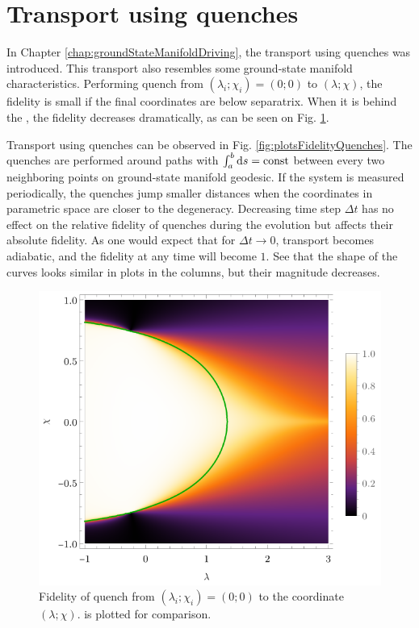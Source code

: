 \section{Transport using quenches}
In Chapter \ref{chap:groundStateManifoldDriving}, the transport using quenches was introduced. This transport also resembles some ground-state manifold characteristics. Performing quench from $(\lambda_i;\chi_i)=(0;0)$ to $(\lambda;\chi)$, the fidelity is small if the final coordinates are below separatrix. When it is behind the , the fidelity decreases dramatically, as can be seen on Fig. \ref{fig:quenchFidelityFrom00}.

Transport using quenches can be observed in Fig. \ref{fig:plotsFidelityQuenches}. The quenches are performed around paths with $\int_{a}^{b} \mathrm{d} s=\text{const}$ between every two neighboring points on ground-state manifold geodesic. If the system is measured periodically, the quenches jump smaller distances when the coordinates in parametric space are closer to the degeneracy. Decreasing time step $\Delta t$ has no effect on the relative fidelity of quenches during the evolution but affects their absolute fidelity. As one would expect that for $\Delta t\rightarrow 0$, transport becomes adiabatic, and the fidelity at any time will become $1$. See that the shape of the curves looks similar in plots in the columns, but their magnitude decreases.

\begin{figure}[h]
    \centering
    \includegraphics[scale=1.2]{../img/quenchFidelityFrom00.pdf}
    \caption{Fidelity of quench from $(\lambda_i;\chi_i)=(0;0)$ to the coordinate $(\lambda;\chi)$.  is plotted for comparison.}
    \label{fig:quenchFidelityFrom00}    
\end{figure}

